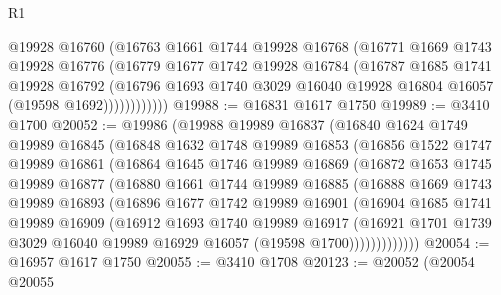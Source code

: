 \begin{lexlean}{R1}
\begin{coremodule}
                @19928
                @16760
                (@16763
                  @1661
                  @1744
                  @19928
                  @16768
                  (@16771
                    @1669
                    @1743
                    @19928
                    @16776
                    (@16779
                      @1677
                      @1742
                      @19928
                      @16784
                      (@16787
                        @1685
                        @1741
                        @19928
                        @16792
                        (@16796
                          @1693
                          @1740
                          @3029
                          @16040
                          @19928
                          @16804
                          @16057
                          (@19598 @1692))))))))))))
@19988 := @16831 @1617 @1750
@19989 := @3410 @1700
@20052 := @19986
    (@19988
      @19989
      @16837
      (@16840
        @1624
        @1749
        @19989
        @16845
        (@16848
          @1632
          @1748
          @19989
          @16853
          (@16856
            @1522
            @1747
            @19989
            @16861
            (@16864
              @1645
              @1746
              @19989
              @16869
              (@16872
                @1653
                @1745
                @19989
                @16877
                (@16880
                  @1661
                  @1744
                  @19989
                  @16885
                  (@16888
                    @1669
                    @1743
                    @19989
                    @16893
                    (@16896
                      @1677
                      @1742
                      @19989
                      @16901
                      (@16904
                        @1685
                        @1741
                        @19989
                        @16909
                        (@16912
                          @1693
                          @1740
                          @19989
                          @16917
                          (@16921
                            @1701
                            @1739
                            @3029
                            @16040
                            @19989
                            @16929
                            @16057
                            (@19598 @1700)))))))))))))
@20054 := @16957 @1617 @1750
@20055 := @3410 @1708
@20123 := @20052
    (@20054
      @20055

\end{coremodule}
\end{lexlean}
